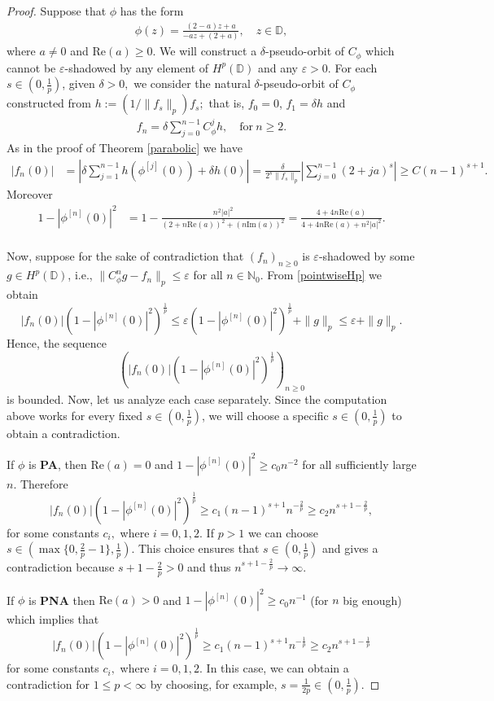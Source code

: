 \documentclass[11pt]{amsart}
\theoremstyle{plain}
\theoremstyle{remark}
\theoremstyle{plain}
\begin{document}
    
\begin{proof} Suppose that $\phi$ has the form 
\begin{align*}
\phi(z)=\frac{(2-a)z+a}{-az+(2+a)}, \quad z\in \mathbb{D},
\end{align*}
where $a \neq 0$ and $\mathrm{Re}(a)\geq 0.$ We will construct a $\delta$-pseudo-orbit of $C_{\phi}$ which cannot be $\varepsilon$-shadowed by any element of $H^p(\mathbb{D})$ and any $\varepsilon>0$. For each $s\in (0, \frac{1}{p})$, given $\delta>0,$ we consider the natural $\delta$-pseudo-orbit of $C_{\phi}$ constructed from $h:=(1/\|f_s\|_p)f_s;$ that is, $f_0 = 0$, $f_1= \delta h$ and 
\begin{align*}
f_n=\delta\sum_{j=0}^{n-1}C_{\phi}^{j}h, \quad \text{for} \ n\geq 2.
\end{align*}
As in the proof of Theorem \ref{parabolic} we have
\begin{align*}
|f_n(0)| &= \left| \delta\sum_{j=1}^{n-1}h(\phi^{[j]}(0))+\delta h(0) \right| = \frac{\delta}{2^s\|f_s\|_p} \left| \sum_{j=0}^{n-1}(2+ja)^s \right| \geq C (n - 1)^{s + 1}.
\end{align*}
Moreover
\begin{align*}
1-|\phi^{[n]}(0)|^2&=1 - \frac{n^2 |a|^2}{(2 + n \mathrm{Re}(a))^2 + (n \mathrm{Im}(a))^2} = \frac{4 + 4 n \mathrm{Re}(a)}{ 4 + 4 n \mathrm{Re}(a) + n^2 |a|^2}.\\
\end{align*}
 

Now, suppose for the sake of contradiction that $(f_n)_{n\geq 0}$ is $\varepsilon$-shadowed by some $g\in H^p(\mathbb{D})$, i.e., $\|C_{\phi}^ng-f_n\|_p\leq\varepsilon$ for all $n\in\mathbb{N}_0$. From \eqref{pointwiseHp} we obtain
\[
    |f_n(0)|(1-|\phi^{[n]}(0)|^2)^{\frac{1}{p}} \leq \varepsilon(1-|\phi^{[n]}(0)|^2)^{\frac{1}{p}}+\|g\|_p \leq \varepsilon+\|g\|_p.
\]
Hence, the sequence $$\left(|f_n(0)|(1-|\phi^{[n]}(0)|^2)^{\frac{1}{p}}\right)_{n\geq0}$$ is bounded. Now, let us analyze each case separately. Since the computation above works for every fixed $s\in(0,\frac{1}{p})$, we will choose a specific $s\in(0,\frac{1}{p})$ to obtain a contradiction.

If $\phi$ is \textbf{PA}, then $\mathrm{Re}(a) = 0$ and $ 1-|\phi^{[n]}(0)|^2 \geq c_0 n^{-2}$ for all sufficiently large $n$. Therefore
$$|f_n(0)|(1 - |\phi^{[n]}(0)|^2)^{\frac{1}{p}} \geq c_1 (n - 1)^{s + 1} n^{- \frac{2}{p}} \geq c_2 n^{s + 1 - \frac{2}{p}},$$
for some constants $c_i,$ where $i=0,1,2.$ If $p > 1$ we can choose $s \in (\max\{0, \frac{2}{p} - 1 \}, \frac{1}{p})$. This choice ensures that $s \in (0, \frac{1}{p})$ and gives a contradiction because $s + 1 - \frac{2}{p} > 0$ and thus $n^{s + 1 - \frac{2}{p}} \to \infty$.

If $\phi$ is \textbf{PNA} then $\mathrm{Re}(a) > 0$ and $ 1-|\phi^{[n]}(0)|^2 \geq c_0 n^{-1}$ (for $n$ big enough) which implies that 
$$|f_n(0)|(1 - |\phi^{[n]}(0)|^2)^{\frac{1}{p}} \geq c_1 (n - 1)^{s + 1} n^{- \frac{1}{p}} \geq c_2 n^{s + 1 - \frac{1}{p}}$$
for some constants $c_i,$ where $i=0,1,2.$ In this case, we can obtain a contradiction for $1 \leq p < \infty$ by choosing, for example, $s = \frac{1}{2p} \in (0, \frac{1}{p}).$
\end{proof}
\end{document}
